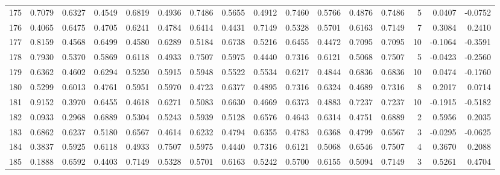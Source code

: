 \begin{tabular}{lrrrrrrrrrrrrrrr}
175 &      0.7079 &  0.6327 &  0.4549 &  0.6819 &  0.4936 &  0.7486 &  0.5655 &  0.4912 &  0.7460 &  0.5766 &   0.4876 &     0.7486 &      5 &                    0.0407 &                    -0.0752 \\
176 &      0.4065 &  0.6475 &  0.4705 &  0.6241 &  0.4784 &  0.6414 &  0.4431 &  0.7149 &  0.5328 &  0.5701 &   0.6163 &     0.7149 &      7 &                    0.3084 &                     0.2410 \\
177 &      0.8159 &  0.4568 &  0.6499 &  0.4580 &  0.6289 &  0.5184 &  0.6738 &  0.5216 &  0.6455 &  0.4472 &   0.7095 &     0.7095 &     10 &                   -0.1064 &                    -0.3591 \\
178 &      0.7930 &  0.5370 &  0.5869 &  0.6118 &  0.4933 &  0.7507 &  0.5975 &  0.4440 &  0.7316 &  0.6121 &   0.5068 &     0.7507 &      5 &                   -0.0423 &                    -0.2560 \\
179 &      0.6362 &  0.4602 &  0.6294 &  0.5250 &  0.5915 &  0.5948 &  0.5522 &  0.5534 &  0.6217 &  0.4844 &   0.6836 &     0.6836 &     10 &                    0.0474 &                    -0.1760 \\
180 &      0.5299 &  0.6013 &  0.4761 &  0.5951 &  0.5970 &  0.4723 &  0.6377 &  0.4895 &  0.7316 &  0.6324 &   0.4689 &     0.7316 &      8 &                    0.2017 &                     0.0714 \\
181 &      0.9152 &  0.3970 &  0.6455 &  0.4618 &  0.6271 &  0.5083 &  0.6630 &  0.4669 &  0.6373 &  0.4883 &   0.7237 &     0.7237 &     10 &                   -0.1915 &                    -0.5182 \\
182 &      0.0933 &  0.2968 &  0.6889 &  0.5304 &  0.5243 &  0.5939 &  0.5128 &  0.6576 &  0.4643 &  0.6314 &   0.4751 &     0.6889 &      2 &                    0.5956 &                     0.2035 \\
183 &      0.6862 &  0.6237 &  0.5180 &  0.6567 &  0.4614 &  0.6232 &  0.4794 &  0.6355 &  0.4783 &  0.6368 &   0.4799 &     0.6567 &      3 &                   -0.0295 &                    -0.0625 \\
184 &      0.3837 &  0.5925 &  0.6118 &  0.4933 &  0.7507 &  0.5975 &  0.4440 &  0.7316 &  0.6121 &  0.5068 &   0.6546 &     0.7507 &      4 &                    0.3670 &                     0.2088 \\
185 &      0.1888 &  0.6592 &  0.4403 &  0.7149 &  0.5328 &  0.5701 &  0.6163 &  0.5242 &  0.5700 &  0.6155 &   0.5094 &     0.7149 &      3 &                    0.5261 &                     0.4704 \\

\end{tabular}
